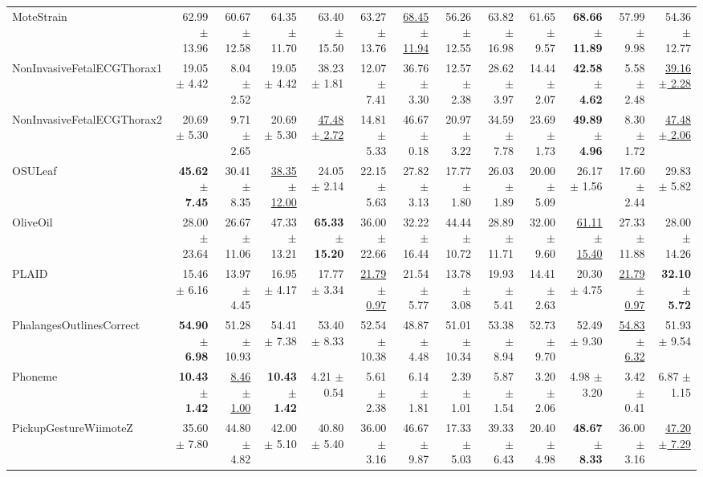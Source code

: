 \begin{landscape}
\begin{longtable}{lrrrrrrrrrrrr}
MoteStrain & 62.99 $\pm$ 13.96 & 60.67 $\pm$ 12.58 & 64.35 $\pm$ 11.70 & 63.40 $\pm$ 15.50 & 63.27 $\pm$ 13.76 & \underline{68.45 $\pm$ 11.94} & 56.26 $\pm$ 12.55 & 63.82 $\pm$ 16.98 & 61.65 $\pm$ 9.57 & \textbf{68.66 $\pm$ 11.89} & 57.99 $\pm$ 9.98 & 54.36 $\pm$ 12.77 \\
NonInvasiveFetalECGThorax1 & 19.05 $\pm$ 4.42 & 8.04 $\pm$ 2.52 & 19.05 $\pm$ 4.42 & 38.23 $\pm$ 1.81 & 12.07 $\pm$ 7.41 & 36.76 $\pm$ 3.30 & 12.57 $\pm$ 2.38 & 28.62 $\pm$ 3.97 & 14.44 $\pm$ 2.07 & \textbf{42.58 $\pm$ 4.62} & 5.58 $\pm$ 2.48 & \underline{39.16 $\pm$ 2.28} \\
NonInvasiveFetalECGThorax2 & 20.69 $\pm$ 5.30 & 9.71 $\pm$ 2.65 & 20.69 $\pm$ 5.30 & \underline{47.48 $\pm$ 2.72} & 14.81 $\pm$ 5.33 & 46.67 $\pm$ 0.18 & 20.97 $\pm$ 3.22 & 34.59 $\pm$ 7.78 & 23.69 $\pm$ 1.73 & \textbf{49.89 $\pm$ 4.96} & 8.30 $\pm$ 1.72 & \underline{47.48 $\pm$ 2.06} \\
OSULeaf & \textbf{45.62 $\pm$ 7.45} & 30.41 $\pm$ 8.35 & \underline{38.35 $\pm$ 12.00} & 24.05 $\pm$ 2.14 & 22.15 $\pm$ 5.63 & 27.82 $\pm$ 3.13 & 17.77 $\pm$ 1.80 & 26.03 $\pm$ 1.89 & 20.00 $\pm$ 5.09 & 26.17 $\pm$ 1.56 & 17.60 $\pm$ 2.44 & 29.83 $\pm$ 5.82 \\
OliveOil & 28.00 $\pm$ 23.64 & 26.67 $\pm$ 11.06 & 47.33 $\pm$ 13.21 & \textbf{65.33 $\pm$ 15.20} & 36.00 $\pm$ 22.66 & 32.22 $\pm$ 16.44 & 44.44 $\pm$ 10.72 & 28.89 $\pm$ 11.71 & 32.00 $\pm$ 9.60 & \underline{61.11 $\pm$ 15.40} & 27.33 $\pm$ 11.88 & 28.00 $\pm$ 14.26 \\
PLAID & 15.46 $\pm$ 6.16 & 13.97 $\pm$ 4.45 & 16.95 $\pm$ 4.17 & 17.77 $\pm$ 3.34 & \underline{21.79 $\pm$ 0.97} & 21.54 $\pm$ 5.77 & 13.78 $\pm$ 3.08 & 19.93 $\pm$ 5.41 & 14.41 $\pm$ 2.63 & 20.30 $\pm$ 4.75 & \underline{21.79 $\pm$ 0.97} & \textbf{32.10 $\pm$ 5.72} \\
PhalangesOutlinesCorrect & \textbf{54.90 $\pm$ 6.98} & 51.28 $\pm$ 10.93 & 54.41 $\pm$ 7.38 & 53.40 $\pm$ 8.33 & 52.54 $\pm$ 10.38 & 48.87 $\pm$ 4.48 & 51.01 $\pm$ 10.34 & 53.38 $\pm$ 8.94 & 52.73 $\pm$ 9.70 & 52.49 $\pm$ 9.30 & \underline{54.83 $\pm$ 6.32} & 51.93 $\pm$ 9.54 \\
Phoneme & \textbf{10.43 $\pm$ 1.42} & \underline{8.46 $\pm$ 1.00} & \textbf{10.43 $\pm$ 1.42} & 4.21 $\pm$ 0.54 & 5.61 $\pm$ 2.38 & 6.14 $\pm$ 1.81 & 2.39 $\pm$ 1.01 & 5.87 $\pm$ 1.54 & 3.20 $\pm$ 2.06 & 4.98 $\pm$ 3.20 & 3.42 $\pm$ 0.41 & 6.87 $\pm$ 1.15 \\
PickupGestureWiimoteZ & 35.60 $\pm$ 7.80 & 44.80 $\pm$ 4.82 & 42.00 $\pm$ 5.10 & 40.80 $\pm$ 5.40 & 36.00 $\pm$ 3.16 & 46.67 $\pm$ 9.87 & 17.33 $\pm$ 5.03 & 39.33 $\pm$ 6.43 & 20.40 $\pm$ 4.98 & \textbf{48.67 $\pm$ 8.33} & 36.00 $\pm$ 3.16 & \underline{47.20 $\pm$ 7.29} \\

\end{longtable}
\end{landscape}
